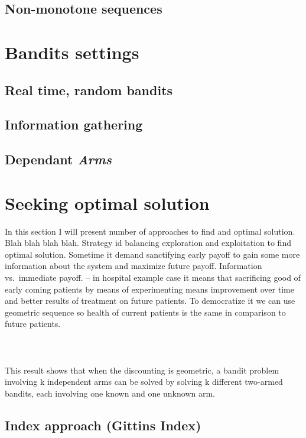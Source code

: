 \documentclass[12pt, a4paper, pdflatex]{report}
\begin{document}
\subsection{Non-monotone sequences}



\section{Bandits settings}
\subsection{Real time, random bandits}
\subsection{Information gathering}
\subsection{Dependant \emph{Arms}}



\section{Seeking optimal solution}
In this section I will present number of approaches to find and optimal solution.\\
Blah blah blah blah.
Strategy id balancing exploration and exploitation to find optimal solution. Sometime it demand sanctifying early payoff to gain some more information about the system and maximize future payoff.
Information vs.\ immediate payoff. -- in hospital example case it means that sacrificing good of early coming patients by means of experimenting means improvement over time and better results of treatment on future patients.
To democratize it we can use geometric sequence so health of current patients is the same in comparison to future patients.\\
\\
\\
\\
This result shows that when the discounting is geometric, a bandit problem involving k independent arms can be solved by solving k different two-armed bandits, each involving one known and one unknown arm.\\

\subsection{Index approach (Gittins Index)}
\end{document}
